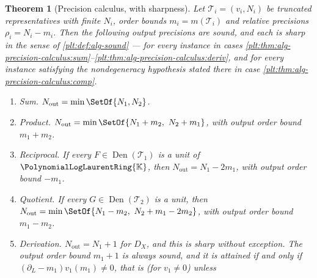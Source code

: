 \documentclass[11pt,oneside]{article}
\theoremstyle{plain}
\newtheorem{theorem}{Theorem}[section]
\theoremstyle{definition}
\theoremstyle{remark}
\newcommand{\K}{\mathbb{K}}
\newcommand{\PLlau}{\PolynomialLogLaurentRing{\K}}       %
\newcommand{\DX}{D_{X}}                                  %
\begin{document}
\begin{theorem}[Precision calculus, with sharpness]
\label{plt:thm:alg-precision-calculus}
Let \(\mathcal T_i=(v_i,N_i)\) be truncated representatives with finite \(N_i\),
order bounds \(m_i=m(\mathcal T_i)\) and relative precisions
\(\rho_i=N_i-m_i\).  Then the following output precisions are sound, and each
is sharp in the sense of \cref{plt:def:alg-sound} --- for \emph{every} instance
in cases \ref{plt:thm:alg-precision-calculus:sum}--\ref{plt:thm:alg-precision-calculus:deriv},
and for every instance satisfying the nondegeneracy hypothesis stated there in
case \ref{plt:thm:alg-precision-calculus:comp}.
\begin{enumerate}
\item\label{plt:thm:alg-precision-calculus:sum}
      \emph{Sum.}  \(N_{\mathrm{out}}=\min\SetOf{N_1,N_2}\).
\item\label{plt:thm:alg-precision-calculus:prod}
      \emph{Product.}  \(N_{\mathrm{out}}=\min\SetOf{N_1+m_2,\ N_2+m_1}\), with
      output order bound \(m_1+m_2\).
\item\label{plt:thm:alg-precision-calculus:recip}
      \emph{Reciprocal.}  If every \(F\in\operatorname{Den}(\mathcal T_1)\) is a unit of
      \(\PLlau\), then \(N_{\mathrm{out}}=N_1-2m_1\), with output order bound
      \(-m_1\).
\item\label{plt:thm:alg-precision-calculus:quot}
      \emph{Quotient.}  If every \(G\in\operatorname{Den}(\mathcal T_2)\) is a unit, then
      \(N_{\mathrm{out}}=\min\SetOf{N_1-m_2,\ N_2+m_1-2m_2}\), with output order
      bound \(m_1-m_2\).
\item\label{plt:thm:alg-precision-calculus:deriv}
      \emph{Derivation.}  \(N_{\mathrm{out}}=N_1+1\) for \(\DX\), and this is
      sharp without exception.  The output order bound \(m_1+1\) is always
      sound, and it is attained if and only if
      \((\partial_L-m_1)v_1(m_1)\ne0\), that is (for \(v_1\ne0\)) unless

\end{enumerate}
\end{theorem}
\end{document}
